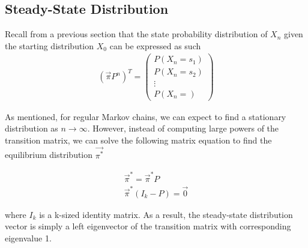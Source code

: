 \documentclass[a4paper,12pt]{article}
\theoremstyle{definition}
\begin{document}
	\subsection{Steady-State Distribution}
	
	Recall from a previous section that the state probability distribution of $X_n$ given the starting distribution $X_0$ can be expressed as such
	\begin{equation*}
	\begin{aligned}
		 (\vec{\pi}P^n)^T =
		 \begin{pmatrix}
		 P(X_n = s_1) \\
		 P(X_n = s_2) \\ 
		 \vdots \\
		 P(X_n =)
		 \end{pmatrix}
	\end{aligned}
	\end{equation*}
	
	As mentioned, for regular Markov chains, we can expect to find a stationary distribution as $n \rightarrow \infty$. However, 
	instead of computing large powers of the transition matrix, we can solve the following matrix equation to find the equilibrium 
	distribution $\vec{\pi^*}$
	
	\begin{equation*}
	\begin{aligned}
		 \vec{\pi}^* = \vec{\pi}^*P \\
		 \vec{\pi}^*(I_k - P) = \vec{0}
	\end{aligned}
	\end{equation*}
    
	where $I_k$ is a k-sized identity matrix. As a result, the steady-state distribution vector is simply a left eigenvector of the 
	transition matrix with corresponding eigenvalue 1.
\end{document}
